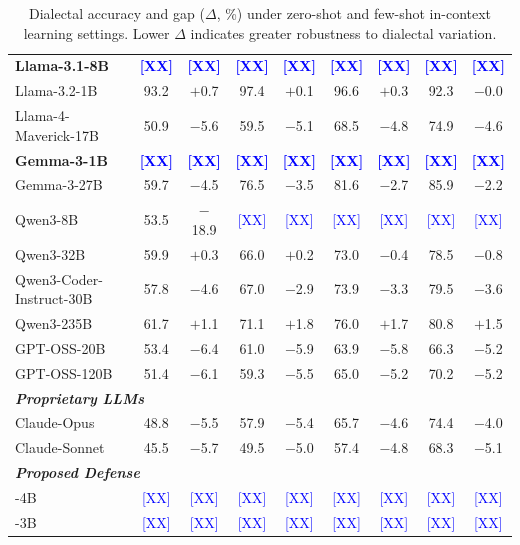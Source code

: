 \begin{table}[t]
\begin{tabular}{lcccccccc}
\textbf{Llama-3.1-8B} & \textcolor{blue}{\textbf{[XX]}} & \textcolor{blue}{\textbf{[XX]}} & \textcolor{blue}{\textbf{[XX]}} & \textcolor{blue}{\textbf{[XX]}} & \textcolor{blue}{\textbf{[XX]}} & \textcolor{blue}{\textbf{[XX]}} & \textcolor{blue}{\textbf{[XX]}} & \textcolor{blue}{\textbf{[XX]}} \\
Llama-3.2-1B & 93.2 & $+$0.7 & 97.4 & $+$0.1 & 96.6 & $+$0.3 & 92.3 & $-$0.0 \\
Llama-4-Maverick-17B & 50.9 & $-$5.6 & 59.5 & $-$5.1 & 68.5 & $-$4.8 & 74.9 & $-$4.6 \\
\textbf{Gemma-3-1B} & \textcolor{blue}{\textbf{[XX]}} & \textcolor{blue}{\textbf{[XX]}} & \textcolor{blue}{\textbf{[XX]}} & \textcolor{blue}{\textbf{[XX]}} & \textcolor{blue}{\textbf{[XX]}} & \textcolor{blue}{\textbf{[XX]}} & \textcolor{blue}{\textbf{[XX]}} & \textcolor{blue}{\textbf{[XX]}} \\
Gemma-3-27B & 59.7 & $-$4.5 & 76.5 & $-$3.5 & 81.6 & $-$2.7 & 85.9 & $-$2.2 \\
Qwen3-8B & 53.5 & $-$18.9 & \textcolor{blue}{[XX]} & \textcolor{blue}{[XX]} & \textcolor{blue}{[XX]} & \textcolor{blue}{[XX]} & \textcolor{blue}{[XX]} & \textcolor{blue}{[XX]} \\
Qwen3-32B & 59.9 & $+$0.3 & 66.0 & $+$0.2 & 73.0 & $-$0.4 & 78.5 & $-$0.8 \\
Qwen3-Coder-Instruct-30B & 57.8 & $-$4.6 & 67.0 & $-$2.9 & 73.9 & $-$3.3 & 79.5 & $-$3.6 \\
Qwen3-235B & 61.7 & $+$1.1 & 71.1 & $+$1.8 & 76.0 & $+$1.7 & 80.8 & $+$1.5 \\
GPT-OSS-20B & 53.4 & $-$6.4 & 61.0 & $-$5.9 & 63.9 & $-$5.8 & 66.3 & $-$5.2 \\
GPT-OSS-120B & 51.4 & $-$6.1 & 59.3 & $-$5.5 & 65.0 & $-$5.2 & 70.2 & $-$5.2 \\
\midrule[\lightrulewidth]
\multicolumn{9}{l}{\textbf{\textit{Proprietary LLMs}}} \\
Claude-Opus & 48.8 & $-$5.5 & 57.9 & $-$5.4 & 65.7 & $-$4.6 & 74.4 & $-$4.0 \\
Claude-Sonnet & 45.5 & $-$5.7 & 49.5 & $-$5.0 & 57.4 & $-$4.8 & 68.3 & $-$5.1 \\
\midrule
\multicolumn{9}{l}{\textbf{\textit{Proposed Defense}}} \\
\diaguard{}-4B & \textcolor{blue}{[XX]} & \textcolor{blue}{[XX]} & \textcolor{blue}{[XX]} & \textcolor{blue}{[XX]} & \textcolor{blue}{[XX]} & \textcolor{blue}{[XX]} & \textcolor{blue}{[XX]} & \textcolor{blue}{[XX]} \\
\diaguard{}-3B & \textcolor{blue}{[XX]} & \textcolor{blue}{[XX]} & \textcolor{blue}{[XX]} & \textcolor{blue}{[XX]} & \textcolor{blue}{[XX]} & \textcolor{blue}{[XX]} & \textcolor{blue}{[XX]} & \textcolor{blue}{[XX]} \\
\bottomrule
\end{tabular}
\caption{Dialectal accuracy and gap ($\Delta$, \%) under zero-shot and few-shot in-context learning settings. Lower $\Delta$ indicates greater robustness to dialectal variation.}
\label{tab:icl_results}
\end{table}
